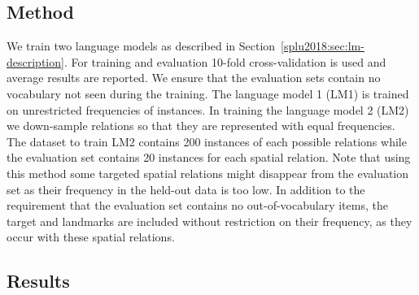 \subsection{Method}\label{splu2018:sec:plain-perplexity-method}

We train two language models as described in
Section~\ref{splu2018:sec:lm-description}. For training and evaluation 10-fold cross-validation is used and average results are reported. %
We ensure that the evaluation sets
contain no vocabulary not seen during the training. The language model 1
(LM1) is trained on unrestricted frequencies of instances. In training the language model 2 (LM2) we
down-sample relations so that they are represented with equal
frequencies. %
The dataset to train LM2 contains 200
instances of each possible relations %
while the evaluation set contains 20 instances for each spatial relation. Note that using this method
some targeted spatial relations might disappear from the evaluation
set as their frequency in the held-out data is too low. In addition to
the requirement that the evaluation set contains no
out-of-vocabulary items, the target and landmarks are included without restriction on their frequency, as they occur with these spatial relations.




\subsection{Results}



